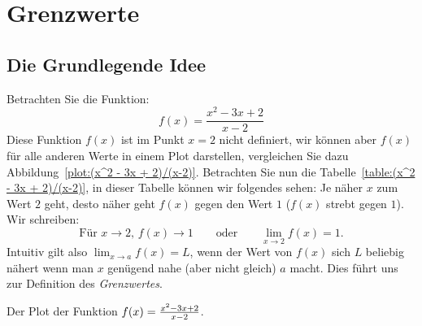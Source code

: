 \chapter{Grenzwerte}


\section{Die Grundlegende Idee}{}{}



Betrachten Sie die Funktion:
\[
f(x) = \frac{x^2 - 3x + 2}{x-2}
\]
Diese Funktion $f(x)$ ist im Punkt $x=2$ nicht definiert, wir können aber $f(x)$ für alle anderen Werte in einem Plot darstellen, vergleichen Sie dazu Abbildung~\ref{plot:(x^2 - 3x + 2)/(x-2)}. Betrachten Sie nun die Tabelle~\ref{table:(x^2 - 3x + 2)/(x-2)}, in dieser Tabelle können wir folgendes sehen: Je näher $x$ zum Wert $2$ geht, desto näher geht $f(x)$ gegen den Wert $1$ ($f(x)$ strebt gegen $1$). Wir schreiben: 
\[
\text{Für $x \to 2$, $f(x) \to 1$}\qquad\text{oder}\qquad \lim_{x\to 2} f(x) = 1.
\]
Intuitiv gilt also $\lim_{x\to a} f(x) = L$, wenn der Wert von $f(x)$ sich $L$ beliebig nähert wenn man $x$ genügend nahe (aber nicht gleich) $a$ macht. Dies führt uns zur Definition des 
\textit{Grenzwertes}.
\begin{marginfigure}[-5in]
\caption{Der Plot der Funktion $f(x)=\protect\frac{x^2 - 3x + 2}{x-2}$.}
\label{plot:(x^2 - 3x + 2)/(x-2)}
\end{marginfigure}

